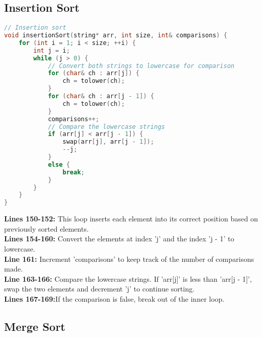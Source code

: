 \documentclass[letterpaper, 10pt,DIV=13]{scrartcl}
\numberwithin{equation}{section} %
\numberwithin{figure}{section} %
\numberwithin{table}{section} %
\begin{document}
\subsection{Insertion Sort}
\begin{linenumbers}
\begin{lstlisting}[language=C++, caption={Insertion Sort}, label={code:example}]
// Insertion sort
void insertionSort(string* arr, int size, int& comparisons) {
    for (int i = 1; i < size; ++i) {
        int j = i;
        while (j > 0) {
            // Convert both strings to lowercase for comparison
            for (char& ch : arr[j]) {
                ch = tolower(ch);
            }
            for (char& ch : arr[j - 1]) {
                ch = tolower(ch);
            }
            comparisons++;
            // Compare the lowercase strings
            if (arr[j] < arr[j - 1]) {
                swap(arr[j], arr[j - 1]);
                --j;
            }
            else {
                break;
            }
        }
    }
}
\end{lstlisting}
\end{linenumbers}
\nolinenumbers

\textbf{Lines 150-152:} This loop inserts each element into its correct position based on previously sorted elements. \\
\textbf{Lines 154-160:} Convert the elements at index 'j' and the index 'j - 1' to lowercase. \\
\textbf{Line 161:} Increment 'comparisons' to keep track of the number of comparisons made. \\
\textbf{Line 163-166:} Compare the lowercase strings. If 'arr[j]' is less than 'arr[j - 1]', swap the two elements and decrement 'j' to continue sorting. \\
\textbf{Lines 167-169:}If the comparison is false, break out of the inner loop. 

\subsection{Merge Sort}
\end{document}

